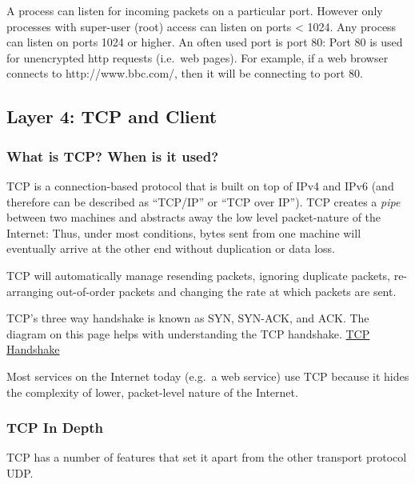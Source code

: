 \documentclass[]{article}
\begin{document}
A process can listen for incoming packets on a particular port. However
only processes with super-user (root) access can listen on ports
\textless{} 1024. Any process can listen on ports 1024 or higher. An
often used port is port 80: Port 80 is used for unencrypted http
requests (i.e.~web pages). For example, if a web browser connects to
http://www.bbc.com/, then it will be connecting to port 80.

\subsection{Layer 4: TCP and Client}\label{layer-4-tcp-and-client}

\subsubsection{What is TCP? When is it
used?}\label{what-is-tcp-when-is-it-used}

TCP is a connection-based protocol that is built on top of IPv4 and IPv6
(and therefore can be described as ``TCP/IP'' or ``TCP over IP''). TCP
creates a \emph{pipe} between two machines and abstracts away the low
level packet-nature of the Internet: Thus, under most conditions, bytes
sent from one machine will eventually arrive at the other end without
duplication or data loss.

TCP will automatically manage resending packets, ignoring duplicate
packets, re-arranging out-of-order packets and changing the rate at
which packets are sent.

TCP's three way handshake is known as SYN, SYN-ACK, and ACK. The diagram
on this page helps with understanding the TCP handshake.
\href{http://www.inetdaemon.com/tutorials/internet/tcp/3-way_handshake.shtml}{TCP
Handshake}

Most services on the Internet today (e.g.~a web service) use TCP because
it hides the complexity of lower, packet-level nature of the Internet.

\subsubsection{TCP In Depth}\label{tcp-in-depth}

TCP has a number of features that set it apart from the other transport
protocol UDP.
\end{document}
